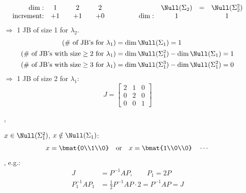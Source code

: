 \begin{example}
\[\begin{array}{r@{\quad}ccccc}
\dim: & 1 & & 2 & & 2\\
\text{increment:} & +1 & & +1 & & +0
\end{array}
\qquad\qquad
\begin{array}{r@{\quad}ccc}
 & \Null(\Sigma_2) & = & \Null(\Sigma_2^2)\\
\dim: & 1 & & 1
\end{array}
\]
$\Rightarrow$ 1 JB of size 1 for $\lambda_2$.
\begin{align*}
(\#\text{ of JB's for }\lambda_1)&=\dim\Null(\Sigma_1)=1\\
(\#\text{ of JB's with size}\geq2\text{ for }\lambda_1)&=\dim\Null(\Sigma_1^2)-\dim\Null(\Sigma_1)=1\\
(\#\text{ of JB's with size}\geq3\text{ for }\lambda_1)&=\dim\Null(\Sigma_1^3)-\dim\Null(\Sigma_1^2)=0
\end{align*}
$\Rightarrow$ 1 JB of size 2 for $\lambda_1$:
\[
J=\left[\begin{array}{cc|c}2&1&0\\0&2&0\\\hline 0&0&1\end{array}\right]
\]

\sep
\begin{minipage}[c]{0.32\textwidth}
\centering
{}
\end{minipage}\hfill
\begin{minipage}[c]{0.64\textwidth}
$x\in\Null(\Sigma_1^2)$, \quad $x\notin\Null(\Sigma_1)$:
\[
x=\bmat{0\\1\\0}\quad\text{or}\quad x=\bmat{1\\0\\0}\quad\cdots
\]
, e.g.:
\begin{align*}
J&=P^{-1}AP, \qquad P_1=2P\\
P_1^{-1}AP_1&=\tfrac12 P^{-1}AP\cdot 2=P^{-1}AP=J
\end{align*}
\end{minipage}


\end{example}
